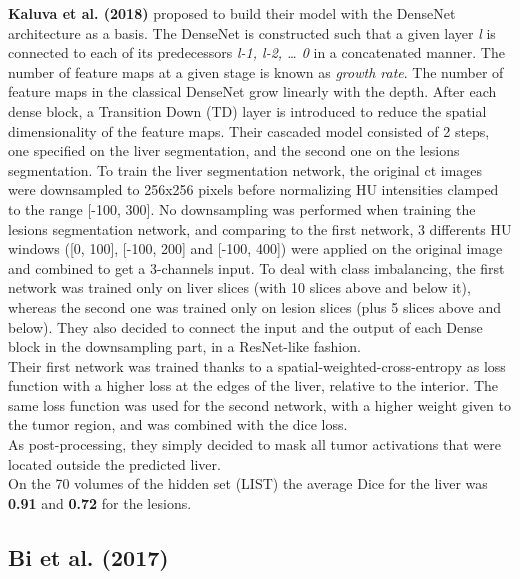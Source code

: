 \textbf{Kaluva et al. (2018)} proposed to build their model with the
DenseNet architecture as a basis. The DenseNet is constructed such that
a given layer \emph{l} is connected to each of its predecessors
\emph{l-1, l-2, \ldots{} 0} in a concatenated manner. The number of
feature maps at a given stage is known as \emph{growth rate}. The number
of feature maps in the classical DenseNet grow linearly with the depth.
After each dense block, a Transition Down (TD) layer is introduced to
reduce the spatial dimensionality of the feature maps.
Their cascaded model consisted of 2 steps, one specified on the liver
segmentation, and the second one on the lesions segmentation.
To train the liver segmentation network, the original \ac{ct} images were
downsampled to 256x256 pixels before normalizing HU intensities clamped
to the range {[}-100, 300{]}.
No downsampling was performed when training the lesions segmentation
network, and comparing to the first network, 3 differents HU windows
({[}0, 100{]}, {[}-100, 200{]} and {[}-100, 400{]}) were applied on the
original image and combined to get a 3-channels input.
To deal with class imbalancing, the first network was trained only on
liver slices (with 10 slices above and below it), whereas the second one
was trained only on lesion slices (plus 5 slices above and below).
They also decided to connect the input and the output of each Dense
block in the downsampling part, in a ResNet-like fashion.\\
Their first network was trained thanks to a
spatial-weighted-cross-entropy as loss function with a higher loss at
the edges of the liver, relative to the interior. The same loss function
was used for the second network, with a higher weight given to the tumor
region, and was combined with the dice loss.\\
As post-processing, they simply decided to mask all tumor activations
that were located outside the predicted liver.\\
On the 70 volumes of the hidden set (LIST) the average Dice for the
liver was \textbf{0.91} and \textbf{0.72} for the lesions.

\subsection*{Bi et al. (2017)}\label{bi-et-al.-2017}


